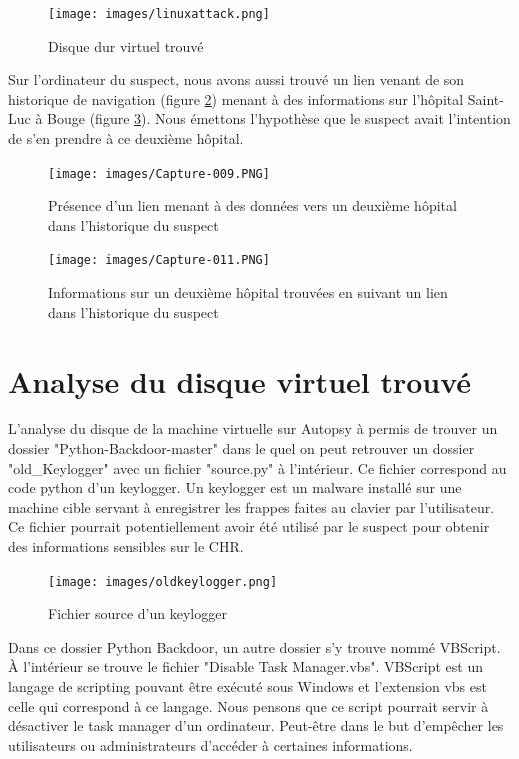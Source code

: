 \documentclass[a4paper]{article}
\begin{document}
\begin{figure}[H]
    \centering
    \texttt{[image: images/linuxattack.png]}
    \caption{Disque dur virtuel trouvé}
    \label{fig:linuxattack}
\end{figure}

Sur l'ordinateur du suspect, nous avons aussi trouvé un lien venant de son historique de navigation (figure \ref{fig:LienSaintLuc}) menant à des informations sur l'hôpital Saint-Luc à Bouge (figure \ref{fig:fichierSaintLuc}). Nous émettons l'hypothèse que le suspect avait l'intention de s'en prendre à ce deuxième hôpital.

\begin{figure}[H]
    \centering
    \texttt{[image: images/Capture-009.PNG]}
    \caption{Présence d'un lien menant à des données vers un deuxième hôpital dans l'historique du suspect}
    \label{fig:LienSaintLuc}
\end{figure}
\begin{figure}[H]
    \centering
    \texttt{[image: images/Capture-011.PNG]}
    \caption{Informations sur un deuxième hôpital trouvées en suivant un lien dans l'historique du suspect}
    \label{fig:fichierSaintLuc}
\end{figure}










\newpage
\section{Analyse du disque virtuel trouvé}

L'analyse du disque de la machine virtuelle sur Autopsy à permis de trouver un dossier "Python-Backdoor-master" dans le quel on peut retrouver un dossier "old\_Keylogger" avec un fichier "source.py" à l'intérieur. Ce fichier correspond au code python d'un keylogger. 
Un keylogger est un malware installé sur une machine cible servant à enregistrer les frappes faites au clavier par l'utilisateur. Ce fichier pourrait potentiellement avoir été utilisé par le suspect pour obtenir des informations sensibles sur le CHR.

\begin{figure}[H]
    \centering
    \texttt{[image: images/oldkeylogger.png]}
    \caption{Fichier source d'un keylogger}
    \label{fig:keylogger}
\end{figure}

Dans ce dossier Python Backdoor, un autre dossier s'y trouve nommé VBScript. À l'intérieur se trouve le fichier "Disable Task Manager.vbs". VBScript est un langage de scripting pouvant être exécuté sous Windows et l'extension vbs est celle qui correspond à ce langage. Nous pensons que ce script pourrait servir à désactiver le task manager d'un ordinateur. Peut-être dans le but d'empêcher les utilisateurs ou administrateurs d'accéder à certaines informations.
\end{document}
